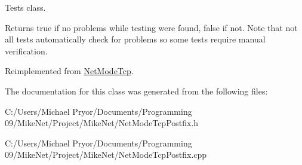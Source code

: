 Tests class. 

\begin{DoxyReturn}{Returns}
true if no problems while testing were found, false if not. Note that not all tests automatically check for problems so some tests require manual verification. 
\end{DoxyReturn}


Reimplemented from \hyperlink{class_net_mode_tcp_ad3f11796c2db6af88ff4fc3f4e820323}{NetModeTcp}.



The documentation for this class was generated from the following files:\begin{DoxyCompactItemize}
\item 
C:/Users/Michael Pryor/Documents/Programming 09/MikeNet/Project/MikeNet/NetModeTcpPostfix.h\item 
C:/Users/Michael Pryor/Documents/Programming 09/MikeNet/Project/MikeNet/NetModeTcpPostfix.cpp\end{DoxyCompactItemize}

